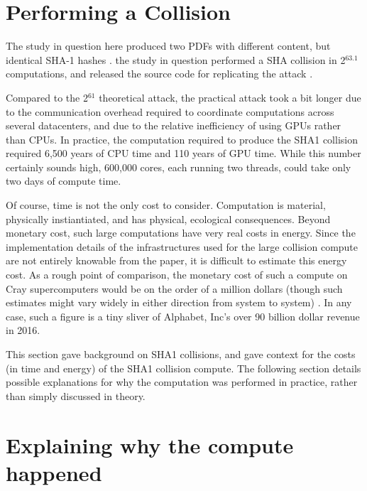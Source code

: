\documentclass[sigconf]{acmart}
\begin{document}
\section{Performing a Collision}
\label{sec:org5e0b70c}

The study in question here produced two PDFs with different content, but identical SHA-1 hashes
\cite{Stevens2017}.
the study in question performed a SHA collision in 2\(^{\text{63.1}}\) computations, 
and released the source code for replicating the attack
\cite{Stevens2017github}.

Compared to the 2\(^{\text{61}}\) theoretical attack, the practical attack took a bit longer due to the communication overhead required to coordinate computations across several datacenters, and due to the relative inefficiency of using GPUs rather than CPUs.
In practice, the computation required to produce the SHA1 collision required 6,500 years of CPU time and 110 years of GPU time. While this number certainly sounds high, 600,000 cores, each running two threads, could take only two days of compute time.

Of course, time is not the only cost to consider.
Computation is material, physically instiantiated, and has physical, ecological consequences.
Beyond monetary cost, such large computations have very real costs in energy.
Since the implementation details of the infrastructures used for the large collision compute are not entirely knowable from the paper,
it is difficult to estimate this energy cost.
As a rough point of comparison, the monetary cost of such a compute on Cray supercomputers would be on the order of a million dollars
(though such estimates might vary widely in either direction from system to system)
\cite{Pautsch2016}.
In any case, such a figure is a tiny sliver of Alphabet, Inc's over 90 billion dollar revenue in 2016.

This section gave background on SHA1 collisions, 
and gave context for the costs (in time and energy) of the SHA1 collision compute.
The following section details possible explanations for why the computation was performed
in practice, rather than simply discussed in theory.


\section{Explaining why the compute happened}
\label{sec:org19a7680}
\end{document}
